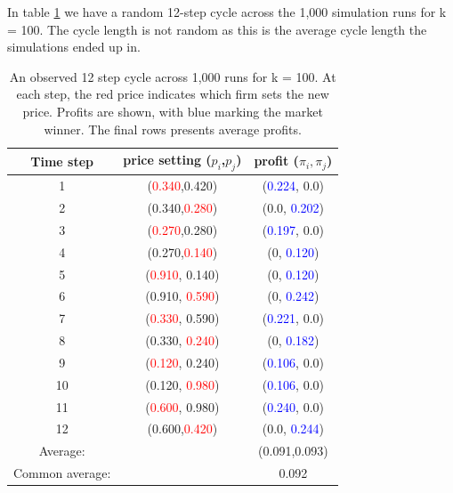 \documentclass{article}
\begin{document}
\newline
In table \ref{tab:CycleLen12} we have a random  12-step cycle across the  1,000 simulation runs for k = 100. The cycle length is not random as this is the average cycle length the simulations ended up in. 
\begin{table}[H]
    \centering
    \begin{tabular}{|c|c|c|}
        \hline
        Time step & price setting ($p_i$,$p_j$) &  profit ($\pi_i,\pi_j$) \\
        \hline
        1 & (\textcolor{red}{0.340},0.420) & (\textcolor{blue}{0.224}, 0.0)  \\
        \hline
        2 & (0.340,\textcolor{red}{0.280}) & (0.0, \textcolor{blue}{0.202}) \\
        \hline
        3 & (\textcolor{red}{0.270},0.280) & (\textcolor{blue}{0.197}, 0.0)  \\
        \hline
        4 & (0.270,\textcolor{red}{0.140}) & (0, \textcolor{blue}{0.120})  \\
        \hline
        5 & (\textcolor{red}{0.910}, 0.140) & (0, \textcolor{blue}{0.120})  \\
        \hline
        6 & (0.910, \textcolor{red}{0.590}) & (0, \textcolor{blue}{0.242})  \\
        \hline
        7 & (\textcolor{red}{0.330}, 0.590) & (\textcolor{blue}{0.221}, 0.0)  \\
        \hline
        8 & (0.330, \textcolor{red}{0.240}) & (0, \textcolor{blue}{0.182})  \\
        \hline
        9 & (\textcolor{red}{0.120}, 0.240) & (\textcolor{blue}{0.106}, 0.0)  \\
        \hline
        10 & (0.120, \textcolor{red}{0.980}) & (\textcolor{blue}{0.106}, 0.0)  \\
        \hline
        11 & (\textcolor{red}{0.600}, 0.980) & (\textcolor{blue}{0.240}, 0.0)  \\
        \hline
        12 & (0.600,\textcolor{red}{0.420}) & (0.0, \textcolor{blue}{0.244})  \\
        \hline
        Average: & & (0.091,0.093) \\
         \hline
         Common average: & & 0.092 \\
         \hline
    \end{tabular}
    \caption{An observed 12 step cycle across 1,000 runs for k = 100. At each step, the red price indicates which firm sets the new price. Profits are shown, with blue marking the market winner. The final rows presents average profits.}
    \label{tab:CycleLen12}
\end{table}
\end{document}
